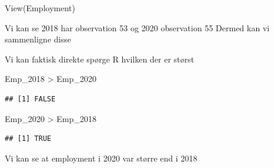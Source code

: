 \documentclass[
  12pt,
]{article}
\newenvironment{Shaded}{\begin{snugshade}}{\end{snugshade}}
\newcommand{\DecValTok}[1]{\textcolor[rgb]{0.00,0.00,0.81}{#1}}
\newcommand{\FunctionTok}[1]{\textcolor[rgb]{0.00,0.00,0.00}{#1}}
\newcommand{\NormalTok}[1]{#1}
\newcommand{\OtherTok}[1]{\textcolor[rgb]{0.56,0.35,0.01}{#1}}
\newcommand{\SpecialCharTok}[1]{\textcolor[rgb]{0.00,0.00,0.00}{#1}}
\begin{document}
\begin{Shaded}
\begin{Highlighting}[]
\FunctionTok{View}\NormalTok{(Employment)}
\end{Highlighting}
\end{Shaded}

Vi kan se 2018 har observation 53 og 2020 observation 55 Dermed kan vi
sammenligne disse

\begin{Shaded}
\end{Shaded}

Vi kan faktisk direkte spørge R hvilken der er størst

\begin{Shaded}
\begin{Highlighting}[]
\NormalTok{Emp\_2018 }\SpecialCharTok{\textgreater{}}\NormalTok{ Emp\_2020}
\end{Highlighting}
\end{Shaded}

\begin{verbatim}
## [1] FALSE
\end{verbatim}

\begin{Shaded}
\begin{Highlighting}[]
\NormalTok{Emp\_2020 }\SpecialCharTok{\textgreater{}}\NormalTok{ Emp\_2018}
\end{Highlighting}
\end{Shaded}

\begin{verbatim}
## [1] TRUE
\end{verbatim}

Vi kan se at employment i 2020 var større end i 2018

  
\end{document}
